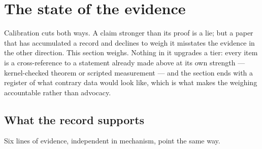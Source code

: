 \documentclass[11pt]{article}
\begin{document}
\section{The state of the evidence}\label{sec:evidence}

Calibration cuts both ways.  A claim stronger than its proof is a lie; but a paper that has
accumulated a record and declines to weigh it misstates the evidence in the other direction.
This section weighs.  Nothing in it upgrades a tier: every item is a cross-reference to a
statement already made above at its own strength --- kernel-checked theorem or scripted
measurement --- and the section ends with a register of what contrary data would look like,
which is what makes the weighing accountable rather than advocacy.

\subsection{What the record supports}\label{sub:evidencefor}

Six lines of evidence, independent in mechanism, point the same way.
\end{document}

